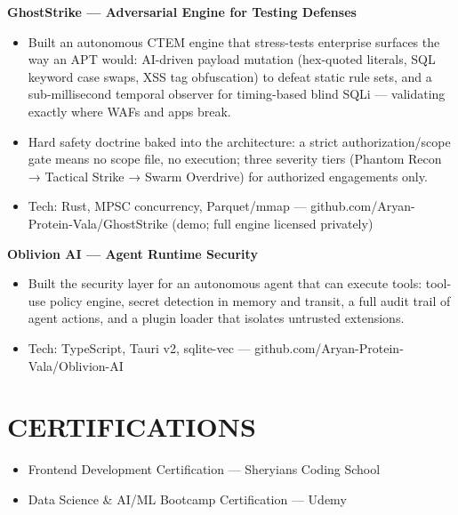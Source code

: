 \documentclass[9pt]{article}
\begin{document}
\textbf{GhostStrike  ---  Adversarial Engine for Testing Defenses}
\vspace{1pt}
\begin{itemize}[leftmargin=11pt,itemsep=0pt,topsep=1pt,parsep=0pt]
\item Built an autonomous CTEM engine that stress-tests enterprise surfaces the way an APT would: AI-driven payload mutation (hex-quoted literals, SQL keyword case swaps, XSS tag obfuscation) to defeat static rule sets, and a sub-millisecond temporal observer for timing-based blind SQLi  ---  validating exactly where WAFs and apps break.
\item Hard safety doctrine baked into the architecture: a strict authorization/scope gate means no scope file, no execution; three severity tiers (Phantom Recon → Tactical Strike → Swarm Overdrive) for authorized engagements only.
\item Tech: Rust, MPSC concurrency, Parquet/mmap  ---  github.com/Aryan-Protein-Vala/GhostStrike (demo; full engine licensed privately)
\end{itemize}
\textbf{Oblivion AI  ---  Agent Runtime Security}
\vspace{1pt}
\begin{itemize}[leftmargin=11pt,itemsep=0pt,topsep=1pt,parsep=0pt]
\item Built the security layer for an autonomous agent that can execute tools: tool-use policy engine, secret detection in memory and transit, a full audit trail of agent actions, and a plugin loader that isolates untrusted extensions.
\item Tech: TypeScript, Tauri v2, sqlite-vec  ---  github.com/Aryan-Protein-Vala/Oblivion-AI
\end{itemize}
\section*{CERTIFICATIONS}
\begin{itemize}[leftmargin=11pt,itemsep=0pt,topsep=1pt,parsep=0pt]
\item Frontend Development Certification  ---  Sheryians Coding School
\item Data Science \& AI/ML Bootcamp Certification  ---  Udemy
\end{itemize}
\end{document}
